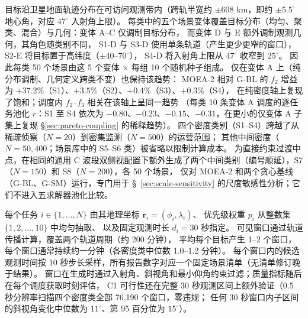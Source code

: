 \documentclass[preprint,12pt,authoryear]{elsarticle}
\begin{document}
目标沿卫星地面轨迹分布在可访问观测带内（跨轨半宽约 $\pm 608$ km，即约 $\pm 5.5^\circ$ 地心角，对应 $47^\circ$ 入射角上限）。
每类中的五个场景变体覆盖目标分布（均匀、聚类、混合）与几何：变体 A--C 仅调制目标分布，
而变体 D 与 E 额外调制观测几何，其角色随类别不同，
S1-D 与 S3-D 使用单条轨道（产生更少更窄的窗口），S2-E 将目标置于高纬度（$\pm 40$--$70^\circ$），
S4-D 将入射角上限从 $47^\circ$ 收窄到 $25^\circ$。
因此每类 50 个场景由这 5 个变体 $\times$ 每组 10 个随机种子组成。
仅在变体 A 上（纯分布调制、几何定义跨类不变）也保持该趋势：
MOEA-2 相对 G-BL 的 $f_2$ 增益为 $+37.2\%$（S1）、$+3.5\%$（S2）、$+0.4\%$（S3）、$+0.3\%$（S4），
在纯密度轴上复现了饱和；调度内 $f_2$--$f_3$ 相关在该轴上呈同一趋势
（每类 10 条变体 A 调度的逐任务池化 $r$：S1 至 S4 依次为 $-0.80$、$-0.23$、$-0.15$、$-0.31$，在更小的仅变体 A 子集上复现 \S\ref{sec:pareto-coupling} 的稀释趋势）。
四个密度类别（S1--S4）跨越了从稀疏侦察（$N=20$）到密集监测（$N=500$）的运营范围；
其他中间密度（$N=50, 400$；场景库中的 S5--S6 类）被省略以限制计算成本。
为直接约束过渡中点，在相同的通用 C 波段双侧视配置下额外生成了两个中间类别（编号顺延），S7（$N=150$）和 S8（$N=200$），各 50 个场景，
仅对 MOEA-2 和两个贪心基线（G-BL、G-SM）运行，专门用于 \S~\ref{sec:scale-sensitivity} 的尺度敏感性分析；它们不进入五求解器池化比较。

每个任务 $i \in \{1,\ldots,N\}$ 由其地理坐标 $\mathbf{r}_i = (\phi_i, \lambda_i)$、
优先级权重 $p_i$ 从整数集 $\{1, 2, \dots, 10\}$ 中均匀抽取、
以及固定观测时长 $d_i = 30$ 秒指定。
可见窗口通过轨道传播计算，覆盖两个轨道周期（约 200 分钟），
平均每个目标产生 1--2 个窗口，每个窗口通常持续约一分钟（各密度类中位数 1.0--1.2 分钟）。
每个窗口内的候选观测时间按 10 秒步长采样，所有报告数字对应一个固定场景清单（无清单修订晚于结果）。
窗口在生成时通过入射角、斜视角和最小仰角约束过滤；质量指标随后在每个调度获取时刻评估，
C1 可行性还在完整 30 秒观测区间上额外验证（0.5 秒分辨率扫描四个密度类全部 76{,}190 个窗口，零违规；
任何 30 秒窗口内子区间的斜视角变化中位数为 $11^\circ$、第 95 百分位为 $15^\circ$）。
\end{document}
